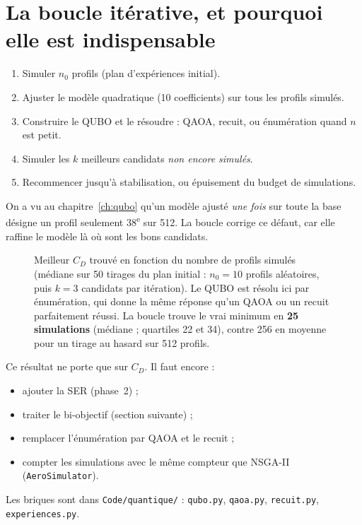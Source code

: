 \section{La boucle itérative, et pourquoi elle est indispensable}
\begin{tcolorbox}[coursbox,colback=white,colframe=cink,title={Algorithme (une seule fonction objectif, ici $C_D$).}]
\begin{enumerate}
\item Simuler $n_0$ profils (plan d'expériences initial).
\item Ajuster le modèle quadratique (10 coefficients) sur tous les profils simulés.
\item Construire le QUBO et le résoudre : QAOA, recuit, ou énumération quand $n$ est petit.
\item Simuler les $k$ meilleurs candidats \emph{non encore simulés}.
\item Recommencer jusqu'à stabilisation, ou épuisement du budget de simulations.
\end{enumerate}
\end{tcolorbox}
On a vu au chapitre~\ref{ch:qubo} qu'un modèle ajusté \emph{une fois} sur toute la base désigne un profil seulement 38\textsuperscript{e} sur 512. La boucle corrige ce défaut, car elle raffine le modèle là où sont les bons candidats.

\begin{figure}[htbp]
\centering

\caption{Meilleur $C_D$ trouvé en fonction du nombre de profils simulés (médiane sur 50 tirages du plan initial : $n_0=10$ profils aléatoires, puis $k=3$ candidats par itération). Le QUBO est résolu ici par énumération, qui donne la même réponse qu'un QAOA ou un recuit parfaitement réussi. La boucle trouve le vrai minimum en \textbf{25 simulations} (médiane ; quartiles 22 et 34), contre 256 en moyenne pour un tirage au hasard sur 512 profils.}\label{fig:boucle}
\end{figure}

\begin{projet}
Ce résultat ne porte que sur $C_D$. Il faut encore :
\begin{itemize}
\item ajouter la SER (phase~2) ;
\item traiter le bi-objectif (section suivante) ;
\item remplacer l'énumération par QAOA et le recuit ;
\item compter les simulations avec le même compteur que NSGA-II (\texttt{AeroSimulator}).
\end{itemize}
Les briques sont dans \texttt{Code/quantique/} : \texttt{qubo.py}, \texttt{qaoa.py}, \texttt{recuit.py}, \texttt{experiences.py}.
\end{projet}

